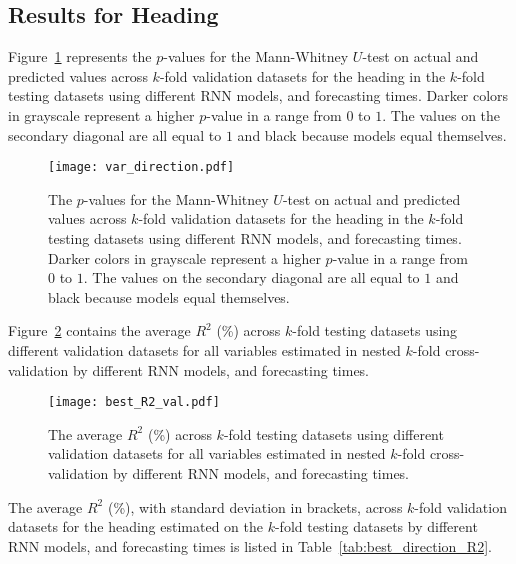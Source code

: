 \subsection{Results for Heading}

Figure~\ref{fig:var_direction} represents the $p$-values for the Mann-Whitney $U$-test on actual and predicted values across $k$-fold validation datasets for the heading in the $k$-fold testing datasets using different RNN models, and forecasting times. Darker colors in grayscale represent a higher $p$-value in a range from $0$ to $1$. The values on the secondary diagonal are all equal to $1$ and black because models equal themselves.

\begin{figure}[!ht]
	\centering
	\texttt{[image: var\_direction.pdf]}
	\caption{The $p$-values for the Mann-Whitney $U$-test on actual and predicted values across $k$-fold validation datasets for the heading in the $k$-fold testing datasets using different RNN models, and forecasting times. Darker colors in grayscale represent a higher $p$-value in a range from $0$ to $1$. The values on the secondary diagonal are all equal to $1$ and black because models equal themselves.}
	\label{fig:var_direction}
\end{figure}

Figure~\ref{fig:best_R2_val} contains the average $R^{2}$ (\%) across $k$-fold testing datasets using different validation datasets for all variables estimated in nested $k$-fold cross-validation by different RNN models, and forecasting times.

\begin{figure}[!ht]
	\centering
	\texttt{[image: best\_R2\_val.pdf]}
	\caption{The average $R^{2}$ (\%) across $k$-fold testing datasets using different validation datasets for all variables estimated in nested $k$-fold cross-validation by different RNN models, and forecasting times.}
	\label{fig:best_R2_val}
\end{figure}

The average $R^{2}$ (\%), with standard deviation in brackets, across $k$-fold validation datasets for the heading estimated on the $k$-fold testing datasets by different RNN models, and forecasting times is listed in Table~\ref{tab:best_direction_R2}.

